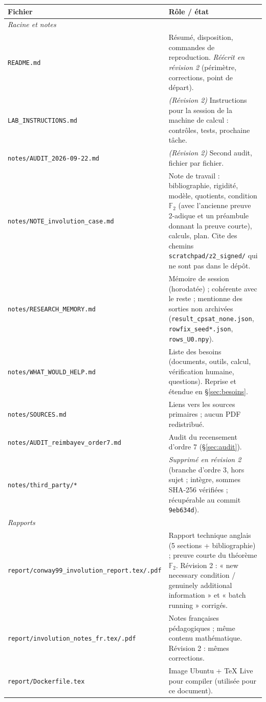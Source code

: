 \documentclass[11pt,a4paper]{article}
\theoremstyle{definition}
\theoremstyle{remark}
\newcommand{\F}{\mathbb{F}}
\newcommand{\code}[1]{\texttt{#1}}
\begin{document}
\begin{longtable}{p{5.2cm}p{9.6cm}}
\toprule
Fichier & Rôle / état\\
\midrule
\multicolumn{2}{l}{\emph{Racine et notes}}\\
\code{README.md} & Résumé, disposition, commandes de reproduction. \emph{Réécrit en révision 2} (périmètre, corrections, point de départ).\\
\code{LAB\_INSTRUCTIONS.md} & \emph{(Révision 2)} Instructions pour la session de la machine de calcul : contrôles, tests, prochaine tâche.\\
\code{notes/AUDIT\_2026-09-22.md} & \emph{(Révision 2)} Second audit, fichier par fichier.\\
\code{notes/NOTE\_involution\_case.md} & Note de travail : bibliographie, rigidité, modèle, quotients, condition $\F_2$ (avec l'ancienne preuve 2-adique et un préambule donnant la preuve courte), calculs, plan. Cite des chemins \code{scratchpad/z2\_signed/} qui ne sont pas dans le dépôt.\\
\code{notes/RESEARCH\_MEMORY.md} & Mémoire de session (horodatée) ; cohérente avec le reste ; mentionne des sorties non archivées (\code{result\_cpsat\_none.json}, \code{rowfix\_seed*.json}, \code{rows\_U0.npy}).\\
\code{notes/WHAT\_WOULD\_HELP.md} & Liste des besoins (documents, outils, calcul, vérification humaine, questions). Reprise et étendue en §\ref{sec:besoins}.\\
\code{notes/SOURCES.md} & Liens vers les sources primaires ; aucun PDF redistribué.\\
\code{notes/AUDIT\_reimbayev\_order7.md} & Audit du recensement d'ordre 7 (§\ref{sec:audit}).\\
\code{notes/third\_party/*} & \emph{Supprimé en révision 2} (branche d'ordre 3, hors sujet ; intègre, sommes SHA-256 vérifiées ; récupérable au commit \code{9eb634d}).\\
\multicolumn{2}{l}{\emph{Rapports}}\\
\code{report/conway99\_involution\_report.tex/.pdf} & Rapport technique anglais (5 sections + bibliographie) ; preuve courte du théorème $\F_2$. Révision 2 : « new necessary condition / genuinely additional information » et « batch running » corrigés.\\
\code{report/involution\_notes\_fr.tex/.pdf} & Notes françaises pédagogiques ; même contenu mathématique. Révision 2 : mêmes corrections.\\
\code{report/Dockerfile.tex} & Image Ubuntu + TeX Live pour compiler (utilisée pour ce document).\\

\end{longtable}
\end{document}
